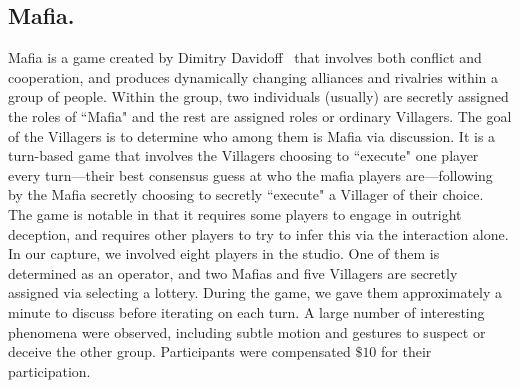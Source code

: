 \subsection{Mafia.} Mafia is a game created by Dimitry Davidoff~\cite{Haffner-99} that involves both conflict and cooperation, and produces dynamically changing alliances and rivalries within a group of people. Within the group, two individuals (usually) are secretly assigned the roles of ``Mafia" and the rest are assigned roles or ordinary Villagers. The goal of the Villagers is to determine who among them is Mafia via discussion. It is a turn-based game that involves the Villagers choosing to ``execute" one player every turn---their best consensus guess at who the mafia players are---following by the Mafia secretly choosing to secretly ``execute" a Villager of their choice. The game is notable in that it requires some players to engage in outright deception, and requires other players to try to infer this via the interaction alone. In our capture, we involved eight players in the studio. One of them is determined as an operator, and two Mafias and five Villagers are secretly assigned via selecting a lottery.  During the game, we gave them approximately a minute to discuss before iterating on each turn. A large number of interesting phenomena were observed, including subtle motion and gestures to suspect or deceive the other group. Participants were compensated $\$10$ for their participation.


